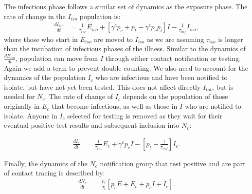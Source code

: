 \documentclass[notitlepage, superscriptaddress]{revtex4-2}
\begin{document}
The infectious phase follows a similar set of dynamics as the exposure phase. The rate of change in the $I_{iso}$ population is:
\begin{eqnarray}
\label{E:dI_iso}
\frac{dI_{iso}}{dt} &= \frac{1}{\tau_{inc}} E_{iso} +  [\gamma^{c} p_{c} + p_{t} - \gamma^{c} p_{c} p_{t}] I - \frac{1}{\tau_{inf}} I_{iso},
\end{eqnarray}
where those who start in $E_{iso}$ are moved to $I_{iso}$ as we are assuming $\tau_{iso}$ is longer than the incubation of infectious phases of the illness. Similar to the dynamics of $\frac{dE_{iso}}{dt}$, population can move from $I$ through either contact notification or testing. Again we add a term to prevent double counting. We also need to account for the dynamics of the population $I_c$ who are infectious and have been notified to isolate, but have not yet been tested. This does not affect directly $I_{tot}$, but is needed for $N_{c}$. The rate of change of $I_c$ depends on the population of those originally in $E_c$ that become infectious, as well as those in $I$ who are notified to isolate. Anyone in $I_{c}$ selected for testing is removed as they wait for their eventual positive test results and subsequent inclusion into $N_c$:

\begin{eqnarray}
\label{E:dI_c}
\frac{dI_{c}}{dt} &= \frac{1}{\tau_{inc}} E_{c} +  \gamma^{c} p_{c} I  - [p_{t} - \frac{1}{\tau_{inf}}]I_{c}.
\end{eqnarray}

Finally, the dynamics of the $N_c$ notification group that test positive and are part of contact tracing is described by:
\begin{eqnarray}
\label{E:dN_c}
\frac{dN_{c}}{dt} &= \frac{p_{t}}{\tau_{t}}[p_{c}E + E_{c} + p_{c}I + I_{c}].
\end{eqnarray}

% 
\end{document}
